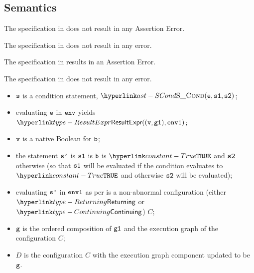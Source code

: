 \subsection{Semantics}
The specification in  does not result in any Assertion Error.

The specification in 
does not result in any error.

The specification in 
results in an Assertion Error.

The specification in  does not result in any error.

\ProseParagraph
\AllApply
\begin{itemize}
\item $\texttt{s}$ is a condition statement, $\SCond(\ve, \vsone, \vstwo)$;
\item evaluating $\texttt{e}$ in $\texttt{env}$ yields $\ResultExpr((\vv, \vgone), \envone)$\ProseOrAbnormal;
\item $\texttt{v}$ is a native Boolean for $\texttt{b}$;
\item the statement $\texttt{s'}$ is $\texttt{s1}$ is $\texttt{b}$ is $\True$ and $\texttt{s2}$ otherwise
      (so that $\texttt{s1}$ will be evaluated if the condition evaluates to $\True$ and otherwise
      $\texttt{s2}$ will be evaluated);
\item evaluating $\texttt{s'}$ in $\texttt{env1}$ as per  is a non-abnormal configuration
      (either $\Returning$ or $\Continuing$) $C$\ProseOrAbnormal;
\item $\texttt{g}$ is the ordered composition of $\texttt{g1}$ and the execution graph of the configuration $C$;
\item $D$ is the configuration $C$ with the execution graph component updated to be $\texttt{g}$.
\end{itemize}

